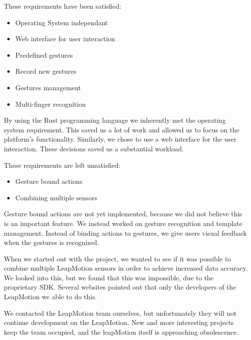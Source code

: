 \documentclass[a4paper]{article}
\providecommand{\tightlist}{%
\setlength{\itemsep}{0pt}\setlength{\parskip}{0pt}}
\begin{document}
  These requirements have been satisfied:
  \begin{itemize}
    \tightlist{}
    \item Operating System independant
    \item Web interface for user interaction
    \item Predefined gestures
    \item Record new gestures
    \item Gestures management
    \item Multi-finger recognition
  \end{itemize}
  By using the Rust programming language we inherently met the operating system
  requirement. This saved us a lot of work and allowed us to focus on the
  platform's functionality. Similarly, we chose to use a web interface for the
  user interaction. These decisions saved us a substantial workload.

  These requirements are left unsatisfied:
  \begin{itemize}
    \tightlist{}
    \item Gesture bound actions
    \item Combining multiple sensors
  \end{itemize}
  Gesture bound actions are not yet implemented, because we did not believe this
  is an important feature. We instead worked on gesture recognition and template
  management. Instead of binding actions to gestures, we give users visual
  feedback when the gestures is recognized.

  When we started out with the project, we wanted to see if it was possible to
  combine multiple LeapMotion sensors in order to achieve increased data
  accuracy. We looked into this, but we found that this was impossible, due to
  the proprietary SDK. Several websites pointed out that only the developers of
  the LeapMotion we able to do this.

  We contacted the LeapMotion team ourselves, but unfortunately they will not
  continue development on the LeapMotion. New and more interesting projects keep
  the team occupied, and the leapMotion itself is approaching obsolescence.
  \clearpage

\end{document}
